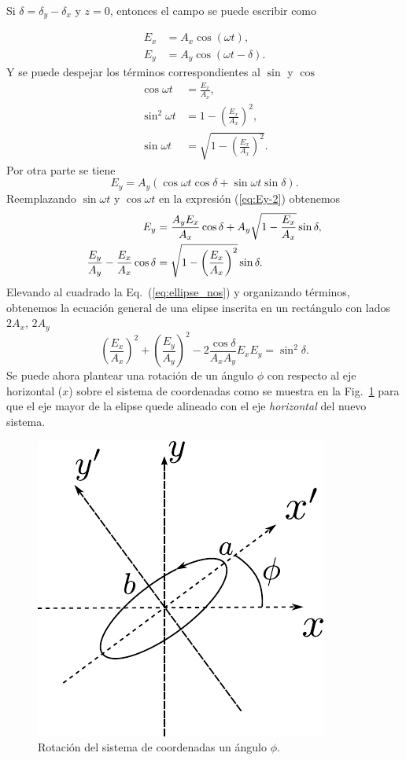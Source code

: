 Si $\delta = \delta_y-\delta_x$ y $z=0$,
entonces el campo se puede escribir como

\begin{align*}
E_x &= A_x\cos{ \left(\omega t \right)},\\
E_y &= A_y\cos{ \left(\omega t -\delta\right)}.
\end{align*}
Y se puede despejar los términos correspondientes al $\sin$ y $\cos$
 \begin{align*}
\cos{\omega t} &=\frac{E_x}{A_x},\\
\sin^2{\omega t} &= 1-\left(\frac{E_x}{A_x}\right)^2,\\
\sin{\omega t} &= \sqrt{1-\left(\frac{E_x}{A_x}\right)^2}.
\end{align*}
Por otra parte se tiene
\begin{equation}
  \label{eq:Ey-2}
E_y = A_y\left( \cos{\omega t}\cos{\delta}+\sin{\omega
    t}\sin{\delta}\right).  
\end{equation}
Reemplazando $\sin{\omega t} $ y $\cos{\omega t} $ en la expresión
(\ref{eq:Ey-2}) obtenemos
\begin{align}
E_y &= \frac{A_yE_x}{A_x}\cos{\delta} +
A_y\sqrt{1-\frac{E_x}{A_x}}\sin{\delta},\notag\\
\frac{E_y}{A_y} - \frac{E_x}{A_x}\cos{\delta}  &= 
\sqrt{1-\left(\frac{E_x}{A_x}\right)^2}\sin{\delta}.\label{eq:ellipse_nos}
\end{align}
Elevando al cuadrado la Eq.~(\ref{eq:ellipse_nos}) y organizando
términos, obtenemos la ecuación general de una elipse inscrita en un
rectángulo con lados $2A_x$, $2A_y$ 
\begin{equation}
\left(\frac{E_x}{A_x}\right)^2+\left(\frac{E_y}{A_y}\right)^2-2\frac{\cos{\delta}}{A_xA_y}E_xE_y
= \sin^2{\delta}.
\label{eq:ellipse}
\end{equation}
Se puede ahora plantear una rotación de un ángulo $\phi$ con respecto
al eje horizontal ($x$) sobre el sistema de coordenadas  como se
muestra en la Fig.~\ref{fig:ellipse} para que
el eje mayor de la elipse quede alineado con el eje
\textit{horizontal} del nuevo sistema. 
\begin{figure}[h!]
\centering
\includegraphics[scale = 1]{ellipse}
\caption[Rotación del sistema de coordenadas de la elipse de polarización]{Rotación del sistema de coordenadas un ángulo $\phi$.}
\label{fig:ellipse}
\end{figure}
